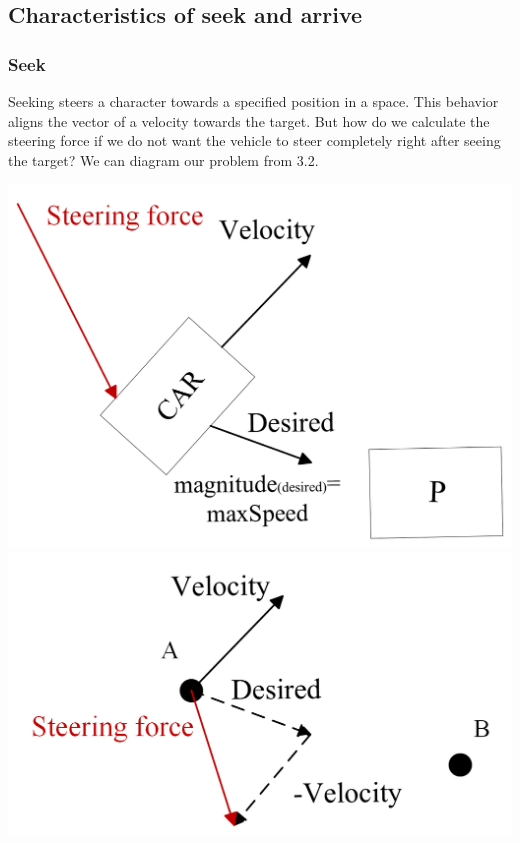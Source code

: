 \documentclass[10pt,twoside,slovak,a4paper]{article}
\begin{document}
\subsection{Characteristics of seek and arrive } \label{characterictics of seek and arrive}

\subsubsection{Seek} \label{seek}



Seeking steers a character towards a specified position in a space. This behavior aligns the vector of a velocity towards the target. But how do we calculate the steering force if we do not want the vehicle to steer completely right after seeing the target? We can diagram our problem from 3.2.


\includegraphics[scale=0.25]{diagram_car.png} 	\includegraphics[scale=0.25]{diagram_steeringForce.png}
\end{document}
